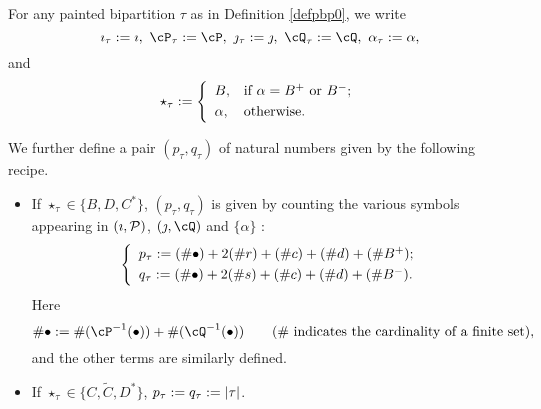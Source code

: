 \documentclass[counting_main.tex]{subfiles}
\begin{document}

For any painted bipartition $\tau$ as in Definition \ref{defpbp0}, we write
\[
  \imath_\tau:=\imath,\ \cP_\tau:=\cP,\ \jmath_\tau:=\jmath,\ \cQ_\tau:=\cQ,\ \alpha_\tau:=\alpha,
\]
and
\[
  \star_\tau:= \left\{
    \begin{array}{ll}
      B, &\hbox{if $\alpha=B^+$ or $B^-$}; \smallskip\\
      \alpha, & \hbox{otherwise}.           \end{array}
  \right.
\]

We further define a pair $(p_{\tau}, q_{\tau})$ of natural numbers given by the
following recipe.
\begin{itemize}
  \item If $\star_\tau\in \{B, D, C^*\}$, $(p_\tau, q_\tau)$ is given by
        counting the various symbols appearing in $(\imath, \mathcal{P})$,
        $(\jmath, \cQ)$ and $\{\alpha\}$ :
        \begin{equation}\label{ptqt}
          \left\{
            \begin{array}{l}
              p_\tau :=( \# \bullet)+ 2 (\# r) +(\# c )+ (\# d) + (\# B^+);\smallskip\\
              q_\tau :=( \# \bullet)+ 2 (\# s) + (\# c) + (\# d) + (\# B^-).\\
            \end{array}
          \right.
        \end{equation}
        Here
        \[
        \#\bullet:=\#(\cP^{-1}(\bullet))+\#(\cQ^{-1}(\bullet))\qquad (\textrm{$\#$
        indicates the cardinality of a finite set}),
        \]
        and the other terms are similarly defined.
  \item If $\star_\tau\in \{C, \widetilde C, D^*\}$,
        $p_\tau:=q_\tau:=\left|{\tau}\right|$.
\end{itemize}
\smallskip
\end{document}
